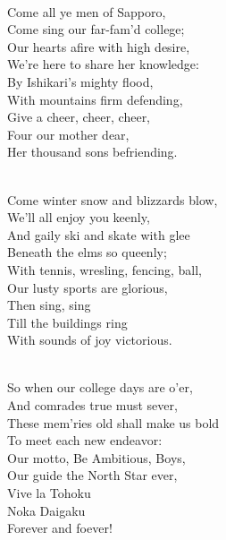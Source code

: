 \documentclass[10pt,b5j]{tarticle} %
\begin{document}
\vspace{1.5em} %
\newcommand{\linespace}{0.5em} %
\newcommand{\blocksize}{0.5\hsize} %
\newcommand{\itemmargin}{6em} %
\begin{enumerate} %
    \setlength{\itemindent}{\itemmargin} %
    \begin{minipage}[c]{\blocksize}
    
        \vspace{\linespace}
        \item~\\
        Come all ye men of Sapporo,\\
          Come sing our far-fam'd college;\\
        Our hearts afire with high desire,\\
          We're here to share her knowledge:\\
        By Ishikari's mighty flood,\\
          With mountains firm defending,\\
            Give a cheer, cheer, cheer,\\
            Four our mother dear,\\
          Her thousand sons befriending.
        
        \vspace{\linespace}
        \item~\\
        Come winter snow and blizzards blow,\\
          We'll all enjoy you keenly,\\
        And gaily ski and skate with glee\\
          Beneath the elms so queenly;\\
        With tennis, wresling, fencing, ball,\\
          Our lusty sports are glorious,\\
            Then sing, sing\\
            Till the buildings ring\\
        With sounds of joy victorious.
        
        \vspace{\linespace}
        \item~\\
        So when our college days are o'er,\\
          And comrades true must sever,\\
        These mem'ries old shall make us bold\\
          To meet each new endeavor:\\
        Our motto, Be Ambitious, Boys,\\
          Our guide the North Star ever,\\
            Vive la Tohoku\\
            Noka Daigaku\\
        Forever and foever!
        

\end{minipage}
\end{enumerate}
\end{document}
